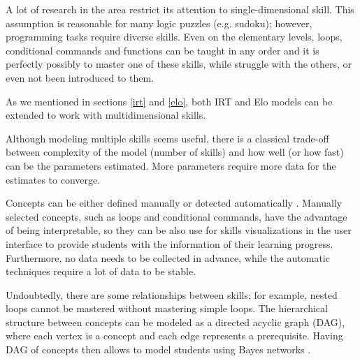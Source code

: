 
A lot of research in the area restrict its attention to single-dimensional skill.
This assumption is reasonable for many logic puzzles (e.g. sudoku);
however, programming tasks require diverse skills.
Even on the elementary levels, loops, conditional commands and functions
  can be taught in any order
  and it is perfectly possibly to master one of these skills,
  while struggle with the others, or even not been introduced to them.


As we mentioned in sections \ref{irt} and \ref{elo},
  both IRT and Elo models can be extended to work with multidimensional skills.

Although modeling multiple skills seems useful,
  there is a classical trade-off between complexity of the model (number of skills)
  and how well (or how fast) can be the parameters estimated.
More parameters require more data for the estimates to converge.



Concepts can be either defined manually or detected automatically
  \cite{niznan-thesis}.  %
Manually selected concepts, such as loops and conditional commands,
  have the advantage of being interpretable,
  so they can be also use for skills visualizations in the user interface
  to provide students with the information of their learning progress.
Furthermore, no data needs to be collected in advance,
  while the automatic techniques require a lot of data to be stable.  %


Undoubtedly, there are some relationships between skills;
  for example, nested loops cannot be mastered without mastering simple loops.
The hierarchical structure between concepts can be modeled
  as a directed acyclic graph (DAG),
  where each vertex is a concept and each edge represents a prerequisite.
Having DAG of concepts then allows to model students using Bayes networks
  \cite{its-programming}.


